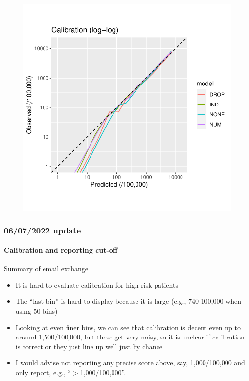\documentclass[12pt]{article}
\begin{document}
\begin{figure}[h]
\centering
\includegraphics[width=1.0\textwidth]{figures/birthyear/calibration10_birthcohort_log.pdf}
\end{figure}




\clearpage
\pagebreak
\subsubsection*{06/07/2022 update}


\paragraph*{Calibration and reporting cut-off} 
Summary of email exchange

\begin{itemize}
	\item It is hard to evaluate calibration for high-risk patients
	\item The ``last bin'' is hard to display because it is large (e.g., 740-100,000 when using 50 bins)
	\item Looking at even finer bins, we can see that calibration is decent even up to around 1,500/100,000, but these get very noisy, so it is unclear if calibration is correct or they just line up well just by chance
	\item I would advise not reporting any precise score above, say, 1,000/100,000 and only report, e.g.,  ``$>$1,000/100,000''.
\end{itemize}
\end{document}
